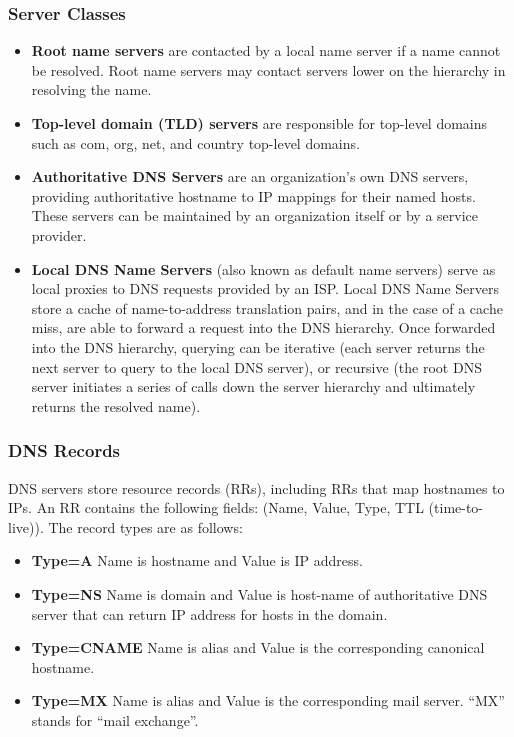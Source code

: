 \documentclass[12pt,titlepage]{article}
\begin{document}
    \subsubsection{Server Classes}
      \begin{itemize}
        \item \textbf{Root name servers} are contacted by a local name server if a name cannot be resolved. Root name servers may contact servers lower on the hierarchy in
        resolving the name.
        \item \textbf{Top-level domain (TLD) servers} are responsible for top-level domains such as com, org, net, and country top-level domains.
        \item \textbf{Authoritative DNS Servers} are an organization's own DNS servers, providing authoritative hostname to IP mappings for their named hosts. These servers
        can be maintained by an organization itself or by a service provider.
        \item \textbf{Local DNS Name Servers} (also known as default name servers) serve as local proxies to DNS requests provided by an ISP. Local DNS Name Servers store
        a cache of name-to-address translation pairs, and in the case of a cache miss, are able to forward a request into the DNS hierarchy. Once forwarded into the DNS hierarchy,
        querying can be iterative (each server returns the next server to query to the local DNS server), or recursive (the root DNS server initiates a series of calls down the
        server hierarchy and ultimately returns the resolved name).
      \end{itemize}

    \subsubsection{DNS Records}
      DNS servers store resource records (RRs), including RRs that map hostnames to IPs. An RR contains the following fields: (Name, Value, Type, TTL (time-to-live)).
      The record types are as follows:
      \begin{itemize}
        \item \textbf{Type=A} Name is hostname and Value is IP address.
        \item \textbf{Type=NS} Name is domain and Value is host-name of authoritative DNS server that can return IP address for hosts in the domain.
        \item \textbf{Type=CNAME} Name is alias and Value is the corresponding canonical hostname.
        \item \textbf{Type=MX} Name is alias and Value is the corresponding mail server. ``MX'' stands for ``mail exchange''.
      \end{itemize}
\end{document}
